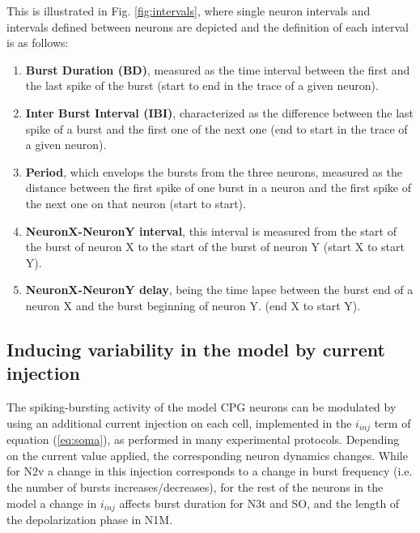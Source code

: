 This is illustrated in Fig. \ref{fig:intervals}, where single neuron intervals and intervals defined between neurons are depicted and the definition of each interval is as follows:
\begin{enumerate}
	\item \textbf{Burst Duration (BD)}, measured as the time interval between the first and the last spike of the burst (start to end in the trace of a given neuron).
	\item \textbf{Inter Burst Interval (IBI)}, characterized as the difference between the last spike of a burst and the first one of the next one (end to start in the trace of a given neuron).
	\item \textbf{Period}, which envelops the bursts from the three neurons, measured as the distance between the first spike of one burst in a neuron and the first spike of the next one on that neuron (start to start).
	\item \textbf{NeuronX-NeuronY interval}, this interval is measured from the start of the burst of neuron X to the start of the burst of neuron Y (start X to start Y).
	\item \textbf{NeuronX-NeuronY delay}, being the time lapse between the burst end of a neuron X and the burst beginning of neuron Y. (end X to start Y).
\end{enumerate}

\subsection{Inducing variability in the model by current injection}
\label{subsec:inj protocol}
The spiking-bursting activity of the model CPG neurons can be modulated by using an additional current injection on each cell, implemented in the \(i_{inj}\) term of equation (\ref{eq:soma}), as performed in many experimental protocols. Depending on the current value applied, the corresponding neuron dynamics changes. While for N2v a change in this injection corresponds to a change in burst frequency (i.e. the number of bursts increases/decreases), for the rest of the neurons in the model a change in \(i_{inj}\) affects burst duration for N3t and SO, and the length of the depolarization phase in N1M.


